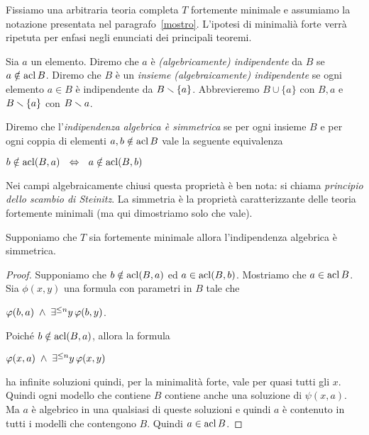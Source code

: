 Fissiamo una arbitraria teoria completa $T$ fortemente minimale e assumiamo la notazione presentata nel paragrafo~\ref{mostro}. L'ipotesi di minimali\`a forte verr\`a ripetuta per enfasi negli enunciati dei principali teoremi.

Sia $a$ un elemento. Diremo che $a$ \`e \emph{(algebricamente) indipendente\/} da $B$ se $a\notin\mathop{\rm acl} B$. Diremo che $B$ \`e un \emph{insieme (algebraicamente) indipendente\/} se ogni elemento $a\in B$ \`e indipendente da $B\smallsetminus\{a\}$. Abbrevieremo $B\cup\{a\}$ con \emph{$B,a$} e  $B\smallsetminus\{a\}$ con \emph{$B\smallsetminus a$}. 

Diremo che l'\emph{indipendenza algebrica \`e simmetrica\/} se per ogni insieme $B$ e per ogni coppia di elementi $a,b\notin\mathop{\rm acl} B$ vale la seguente equivalenza 

\hfill$b\notin\acl (B,a)\ \ \IFF\ \ a\notin\acl(B,b)$\hfill{}

Nei campi algebraicamente chiusi questa propriet\`a \`e ben nota: si chiama \emph{principio dello scambio di Steinitz}. La simmetria \`e la propriet\`a caratterizzante delle teoria fortemente minimali (ma qui dimostriamo solo che vale).

\begin{theorem}
Supponiamo che $T$ sia fortemente minimale allora l'indipendenza algebrica \`e simmetrica.
\end{theorem} 

\begin{proof} 
Supponiamo che $b\notin\mathop{\rm acl}(B,a)$ ed $a\in\mathop{\rm acl}(B,b)$. Mostriamo che $a\in\mathop{\rm acl} B$. Sia $\phi(x,y)$ una formula con parametri in $B$ tale che 

\hfil$\varphi(b,a)\;\wedge\;\exists^{\le n}y\,\varphi(b,y)$.

Poich\'e $b\notin\mathop{\rm acl}(B,a)$, allora la formula

\hfil{}$\varphi(x,a)\;\wedge\;\exists^{\le n}y\,\varphi(x,y)$\phantom{.}

ha infinite soluzioni quindi, per la minimalit\`a forte, vale per quasi tutti gli $x$. Quindi ogni modello che contiene $B$ contiene anche una soluzione di $\psi(x,a)$. Ma $a$ \`e algebrico in una qualsiasi di queste soluzioni e quindi $a$ \`e contenuto in tutti i modelli che contengono $B$. Quindi $a\in\mathop{\rm acl} B$.
\end{proof}

% 


